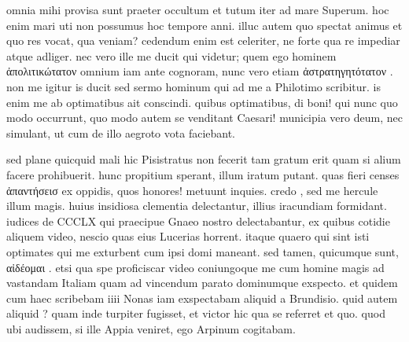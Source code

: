 


 omnia mihi provisa sunt praeter occultum et tutum iter ad mare Superum. hoc enim mari uti non possumus hoc tempore anni. illuc autem quo spectat animus et quo res vocat, qua veniam? cedendum enim est celeriter, ne forte qua re impediar atque adliger. nec vero ille me ducit qui videtur; quem ego hominem ἀπολιτικώτατον omnium iam ante cognoram, nunc vero etiam ἀστρατηγητότατον . non me igitur is ducit sed sermo hominum qui ad me a Philotimo scribitur. is enim me ab optimatibus ait conscindi. quibus optimatibus, di boni! qui nunc quo modo occurrunt, quo modo autem se venditant Caesari! municipia vero deum, nec simulant, ut cum de illo aegroto vota faciebant.

 sed plane quicquid mali hic Pisistratus non fecerit tam gratum erit quam si alium facere prohibuerit. hunc propitium sperant, illum iratum putant. quas fieri censes ἀπαντήσεισ ex oppidis, quos honores! metuunt inquies. credo , sed me hercule illum magis. huius insidiosa clementia delectantur, illius iracundiam formidant. iudices de CCCLX qui praecipue Gnaeo nostro delectabantur, ex quibus cotidie aliquem video, nescio quas eius Lucerias horrent. itaque quaero qui sint isti optimates qui me exturbent cum ipsi domi maneant. sed tamen, quicumque sunt, αἰδέομαι . etsi qua spe proficiscar video coniungoque me cum homine magis ad vastandam Italiam quam ad vincendum parato dominumque exspecto. et quidem cum haec scribebam iiii Nonas iam exspectabam aliquid a Brundisio. quid autem aliquid ? quam inde turpiter fugisset, et victor hic qua se referret et quo. quod ubi audissem, si ille Appia veniret, ego Arpinum cogitabam.
